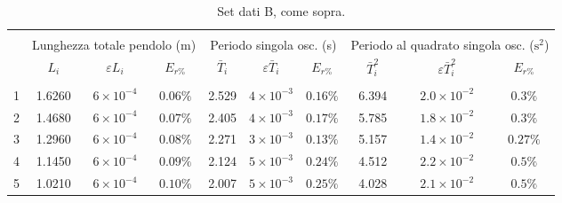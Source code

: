 \documentclass[italian, a4paper, 10pt, twocolumn]{../../style/lab_unige}
\begin{document}
  \begin{table}[t!]
    \footnotesize
    \centering
    \caption{Set dati B, come sopra.}
    \label{tab:B}
    \setlength{\tabcolsep}{1.985\tabcolsep}
    \begin{tabular}{lccccccccc}
      \hline\hline\\[-1.5ex]
        & \multicolumn{3}{c}{Lunghezza totale pendolo (m)}  & \multicolumn{3}{c}{Periodo singola osc. (s)}          & \multicolumn{3}{c}{Periodo al quadrato singola osc. ($\text{s}^{2}$)} \\[+0.5ex] 
        & $L_{i}$ & $\varepsilon L_{i}$ & $E_{r\%}$         & $\bar{T}_{i}$  & $\varepsilon\bar{T}_{i}$ & $E_{r\%}$ & $\bar{T}_{i}^{2}$ & $\varepsilon\bar{T}_{i}^{2}$ & $E_{r\%}$     \\[+0.5ex] \hline \\[-1.5ex]
      1 & 1.6260  & $6\times10^{-4}$    & $0.06\%$          & 2.529          & $4\times10^{-3}$         & $0.16\%$  & 6.394             & $2.0\times10^{-2}$           & $0.3\%$       \\[+0.5ex]
      2 & 1.4680  & $6\times10^{-4}$    & $0.07\%$          & 2.405          & $4\times10^{-3}$         & $0.17\%$  & 5.785             & $1.8\times10^{-2}$           & $0.3\%$       \\[+0.5ex]
      3 & 1.2960  & $6\times10^{-4}$    & $0.08\%$          & 2.271          & $3\times10^{-3}$         & $0.13\%$  & 5.157             & $1.4\times10^{-2}$           & $0.27\%$      \\[+0.5ex]
      4 & 1.1450  & $6\times10^{-4}$    & $0.09\%$          & 2.124          & $5\times10^{-3}$         & $0.24\%$  & 4.512             & $2.2\times10^{-2}$           & $0.5\%$       \\[+0.5ex]
      5 & 1.0210  & $6\times10^{-4}$    & $0.10\%$          & 2.007          & $5\times10^{-3}$         & $0.25\%$  & 4.028             & $2.1\times10^{-2}$           & $0.5\%$       \\[+0.5ex]
      \hline
    \end{tabular}
  \end{table}
\end{document}
